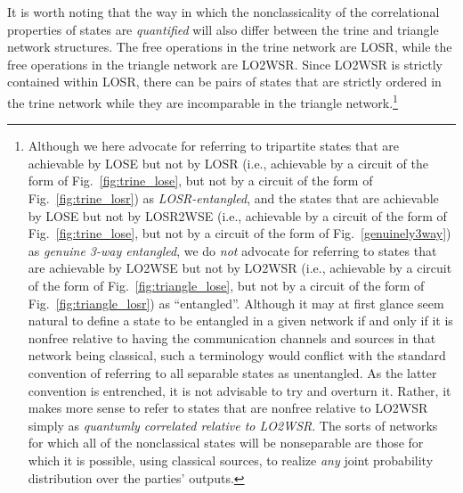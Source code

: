 \documentclass[prx,11pt,letterpaper,twocolumn,accepted=2023-11-27]{quantumarticle}
\theoremstyle{plain}
\theoremstyle{definition}
\begin{document}
\begin{appendices}
It is worth noting that the way in which the nonclassicality of the correlational properties of states are {\em quantified} will also differ between the trine and triangle network structures. The free operations in the trine network are LOSR, while the free operations in the triangle network are LO2WSR.
 Since LO2WSR is strictly contained within LOSR, there can be pairs of states that are strictly ordered in the trine network while they are incomparable in the triangle network.\footnote{Although we here advocate for referring to tripartite states that are achievable by LOSE but not by LOSR 
     (i.e., achievable by a circuit of the form of Fig.~\ref{fig:trine_lose}, but not by a circuit of the form of Fig.~\ref{fig:trine_losr})
     as {\em LOSR-entangled}, and the states that are achievable by LOSE but not by LOSR2WSE (i.e., achievable by a circuit of the form of Fig.~\ref{fig:trine_lose}, but not by a circuit of the form of Fig.~\ref{genuinely3way}) as {\em genuine 3-way entangled}, we  do {\em not} advocate for referring to states that are achievable by LO2WSE but not by LO2WSR  (i.e., achievable by a circuit of the form of Fig.~\ref{fig:triangle_lose}, but not by a circuit of the form of Fig.~\ref{fig:triangle_losr})
  as ``entangled''.
  Although it may at first glance seem natural to define a state to be entangled in a given network if and only if it is nonfree relative to having the communication channels and sources in that network being classical,
   such a terminology would conflict with the standard convention of referring to all separable states as unentangled.  As the latter convention is entrenched, it is not advisable to try and overturn it. Rather, it makes more sense to refer to states that are nonfree relative to LO2WSR
  simply as {\em quantumly correlated relative to LO2WSR}.  The sorts of networks for which all of the nonclassical states will be nonseparable are those for which it is possible, using classical sources, to realize {\em any} joint probability distribution over the parties' outputs. }


\end{appendices}
\end{document}
